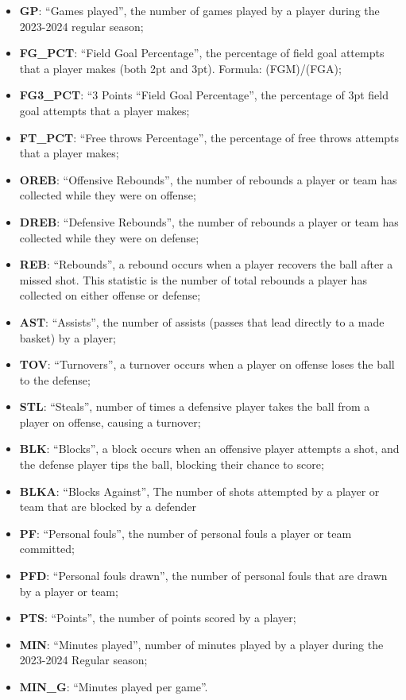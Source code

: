 \documentclass[
]{article}
\providecommand{\tightlist}{%
  \setlength{\itemsep}{0pt}\setlength{\parskip}{0pt}}
\begin{document}
\begin{itemize}
\tightlist
\item
  \textbf{GP}: ``Games played'', the number of games played by a player
  during the 2023-2024 regular season;
\item
  \textbf{FG\_PCT}: ``Field Goal Percentage'', the percentage of field
  goal attempts that a player makes (both 2pt and 3pt). Formula:
  (FGM)/(FGA);
\item
  \textbf{FG3\_PCT}: ``3 Points ``Field Goal Percentage'', the
  percentage of 3pt field goal attempts that a player makes;
\item
  \textbf{FT\_PCT}: ``Free throws Percentage'', the percentage of free
  throws attempts that a player makes;
\item
  \textbf{OREB}: ``Offensive Rebounds'', the number of rebounds a player
  or team has collected while they were on offense;
\item
  \textbf{DREB}: ``Defensive Rebounds'', the number of rebounds a player
  or team has collected while they were on defense;
\item
  \textbf{REB}: ``Rebounds'', a rebound occurs when a player recovers
  the ball after a missed shot. This statistic is the number of total
  rebounds a player has collected on either offense or defense;
\item
  \textbf{AST}: ``Assists'', the number of assists (passes that lead
  directly to a made basket) by a player;
\item
  \textbf{TOV}: ``Turnovers'', a turnover occurs when a player on
  offense loses the ball to the defense;
\item
  \textbf{STL}: ``Steals'', number of times a defensive player takes the
  ball from a player on offense, causing a turnover;
\item
  \textbf{BLK}: ``Blocks'', a block occurs when an offensive player
  attempts a shot, and the defense player tips the ball, blocking their
  chance to score;
\item
  \textbf{BLKA}: ``Blocks Against'', The number of shots attempted by a
  player or team that are blocked by a defender
\item
  \textbf{PF}: ``Personal fouls'', the number of personal fouls a player
  or team committed;
\item
  \textbf{PFD}: ``Personal fouls drawn'', the number of personal fouls
  that are drawn by a player or team;
\item
  \textbf{PTS}: ``Points'', the number of points scored by a player;
\item
  \textbf{MIN}: ``Minutes played'', number of minutes played by a player
  during the 2023-2024 Regular season;
\item
  \textbf{MIN\_G}: ``Minutes played per game''.
\end{itemize}
\end{document}
